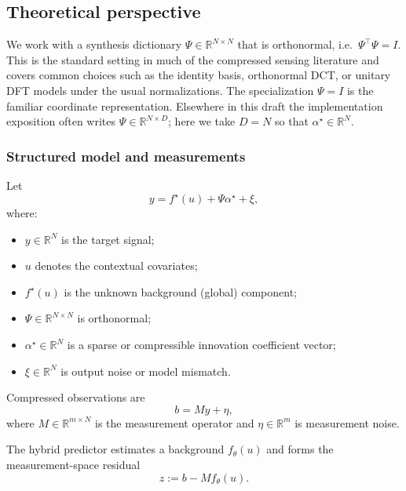
\subsection{Theoretical perspective}
\label{subsec:theory_hybrid_sircs_perspective}

We work with a synthesis dictionary $\Psi\in\mathbb{R}^{N\times N}$ that is orthonormal, i.e.\ $\Psi^\top\Psi=I$.
This is the standard setting in much of the compressed sensing literature and covers common choices such as the identity basis, orthonormal DCT, or unitary DFT models under the usual normalizations.
The specialization $\Psi=I$ is the familiar coordinate representation.
Elsewhere in this draft the implementation exposition often writes $\Psi\in\mathbb{R}^{N\times D}$; here we take $D=N$ so that $\alpha^\star\in\mathbb{R}^N$.

\subsubsection{Structured model and measurements}

Let
\begin{equation}
  y = f^\star(u) + \Psi \alpha^\star + \xi,
  \label{eq:model_y}
\end{equation}
where:
\begin{itemize}
  \item $y\in\mathbb{R}^N$ is the target signal;
  \item $u$ denotes the contextual covariates;
  \item $f^\star(u)$ is the unknown background (global) component;
  \item $\Psi\in\mathbb{R}^{N\times N}$ is orthonormal;
  \item $\alpha^\star\in\mathbb{R}^N$ is a sparse or compressible innovation coefficient vector;
  \item $\xi\in\mathbb{R}^N$ is output noise or model mismatch.
\end{itemize}
Compressed observations are
\begin{equation}
  b = M y + \eta,
  \label{eq:measurement_model}
\end{equation}
where $M\in\mathbb{R}^{m\times N}$ is the measurement operator and $\eta\in\mathbb{R}^m$ is measurement noise.

The hybrid predictor estimates a background $f_\theta(u)$ and forms the measurement-space residual
\begin{equation}
  z := b - M f_\theta(u).
  \label{eq:def_z}
\end{equation}

